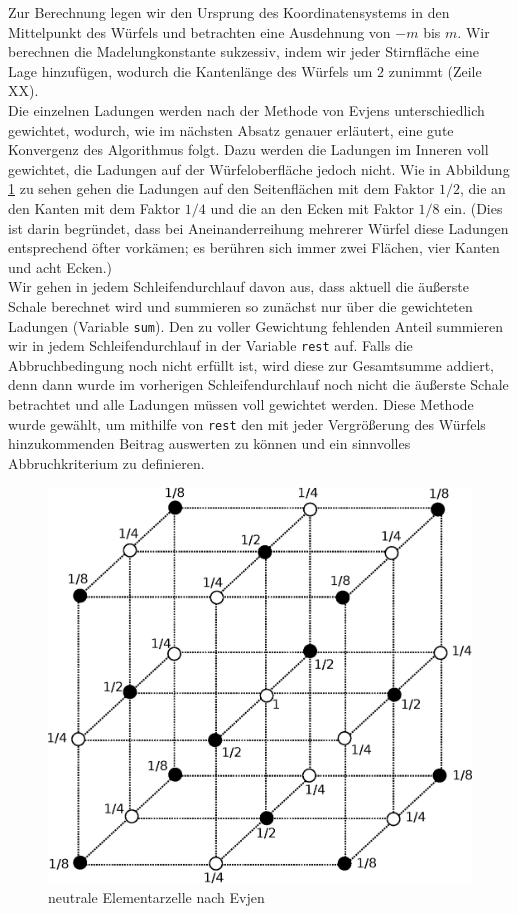 \documentclass[10pt,a4paper]{article}
\begin{document}
Zur Berechnung legen wir den Ursprung des Koordinatensystems in den Mittelpunkt des
Würfels und betrachten eine Ausdehnung von $-m$ bis $m$.
Wir berechnen die Madelungkonstante sukzessiv, indem wir jeder Stirnfläche eine Lage
hinzufügen, wodurch die Kantenlänge des Würfels um $2$ zunimmt (Zeile XX).\\
Die einzelnen Ladungen werden nach der Methode von
Evjens \cite{Evjen} unterschiedlich gewichtet, wodurch, wie im nächsten Absatz genauer
erläutert, eine gute Konvergenz des Algorithmus folgt. Dazu werden die Ladungen im
Inneren voll gewichtet, die Ladungen auf der Würfeloberfläche jedoch nicht. Wie in
Abbildung \ref{skalierungsgrafik3d} zu sehen gehen die Ladungen auf den Seitenflächen mit
dem Faktor $1/2$, die an den Kanten mit dem Faktor $1/4$ und die an den Ecken mit Faktor
$1/8$ ein. (Dies ist darin begründet, dass bei Aneinanderreihung mehrerer Würfel diese
Ladungen entsprechend öfter vorkämen; es berühren sich immer zwei Flächen, vier Kanten
und acht Ecken.)\\
Wir gehen in jedem Schleifendurchlauf davon aus, dass aktuell die äußerste Schale berechnet
wird und summieren so zunächst nur über die gewichteten Ladungen (Variable \texttt{sum}).
Den zu voller Gewichtung fehlenden Anteil summieren wir in jedem Schleifendurchlauf in der Variable
\texttt{rest} auf. Falls die Abbruchbedingung noch nicht erfüllt ist, wird diese zur
Gesamtsumme addiert, denn dann wurde im vorherigen Schleifendurchlauf noch nicht die
äußerste Schale betrachtet und alle Ladungen müssen voll gewichtet werden. Diese Methode
wurde gewählt, um mithilfe von \texttt{rest} den mit jeder Vergrößerung des Würfels
hinzukommenden Beitrag auswerten zu können und ein sinnvolles Abbruchkriterium zu definieren.\\

\begin{figure}[h]
	\centering
	\includegraphics[scale = 0.35]{./figures/wuerfel.eps}
	\caption{neutrale Elementarzelle nach Evjen}
	\label{skalierungsgrafik3d}
\end{figure}
\end{document}
